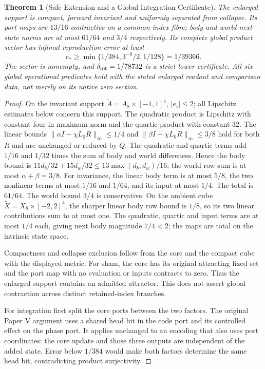 \documentclass[11pt,a4paper]{article}
\newtheorem{theorem}{Theorem}[section]
\theoremstyle{definition}
\begin{document}
\begin{theorem}[Safe Extension and a Global Integration Certificate]
\label{thm:bridge-quartic-global-certificate}
The enlarged support is compact, forward invariant and uniformly separated
from collapse. Its port maps are $13/16$-contractive on a common-index fibre;
body and world next-state norms are at most $61/64$ and $3/4$ respectively.
Its complete global product sector has infimal reproduction error at least
\[
 e_*\ge\min\{1/384,3^{-9}/2,1/128\}=1/39366.
\]
The sector is nonempty, and $\delta_{\rm int}=1/78732$ is a strict lower
certificate. All six global operational predicates hold with the stated
enlarged readout and comparison data, not merely on its native zero section.
\end{theorem}
\begin{proof}
On the invariant support $\widetilde A=A_8\times[-1,1]^4$, $|e_i|\le2$;
all Lipschitz estimates below concern this support. The quadratic product is Lipschitz with constant four in
maximum norm and the quartic product with constant 32. The linear bounds
$\|\alpha I-\chi L_0R\|_\infty\le1/4$ and
$\|\beta I+\chi L_0R\|_\infty\le3/8$ hold for both $R$ and are unchanged
or reduced by $Q$. The quadratic and quartic terms add $1/16$ and $1/32$
times the sum of body and world differences. Hence the body bound is
$11d_b/32+15d_w/32\le13\max(d_b,d_w)/16$; the world row sum is at most
$\alpha+\beta=3/8$. For invariance, the linear body term is at most $5/8$,
the two nonlinear terms at most $1/16$ and $1/64$, and its input at most
$1/4$. The total is $61/64$. The world bound $3/4$ is conservative.
On the ambient cube $\widetilde X=X_8\times[-2,2]^4$, the sharper linear body row bound is $1/8$,
so its two linear contributions sum to at most one. The quadratic, quartic
and input terms are at most $1/4$ each, giving next body magnitude
$7/4<2$; the maps are total on the intrinsic state space.

Compactness and collapse exclusion follow from the core and the compact
cube with the displayed metric. For sham, the core has its original
attracting fixed set and the port map with no evaluation or inputs contracts
to zero. Thus the enlarged support contains an admitted attractor. This does
not assert global contraction across distinct retained-index branches.

For integration first split the core ports between the two factors. The
original Paper V argument uses a shared head bit in the code port and its
controlled effect on the phase port. It applies unchanged to an encoding
that also uses port coordinates: the core update and those three outputs
are independent of the added state. Error below $1/384$ would make both
factors determine the same head bit, contradicting product surjectivity.


\end{proof}
\end{document}
